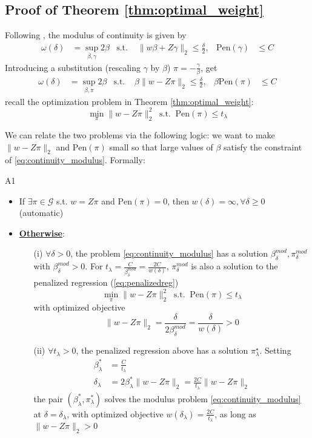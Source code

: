\documentclass[twoside]{article}
\theoremstyle{definition}
\begin{document}
\subsection{Proof of Theorem \ref{thm:optimal_weight}}
Following \citet[Equation (25)]{armstrong2018optimal}, the modulus of continuity is given by 
\begin{align*}
  \omega(\delta) &=\sup_{\beta,\gamma}2\beta &\text{s.t.\ }&\lVert w\beta+Z\gamma \rVert_2 \leq \frac{\delta}{2}, &\mathrm{Pen}(\gamma) &\leq C
\end{align*}
Introducing a substitution (rescaling $\gamma$ by $\beta$) $\pi = -\frac{\gamma}{\beta}$, get 
\begin{align}\label{eq:continuity_modulus}
  \omega(\delta) &=\sup_{\beta,\pi}2\beta &\text{s.t.\ }&\beta\lVert w-Z\pi \rVert_2 \leq \frac{\delta}{2}, &\beta\mathrm{Pen}(\pi) &\leq C
\end{align}
recall the optimization problem in Theorem \ref{thm:optimal_weight}:
$$ \min_{\pi}\lVert w-Z\pi \rVert^2_2 \ \text{ s.t. }\ \mathrm{Pen}(\pi)\leq t_{\lambda} $$

We can relate the two problems via the following logic: we want to make $\lVert w-Z\pi \rVert_2$ and $\mathrm{Pen}(\pi)$ small so that large values of $\beta$ satisfy the constraint of \ref{eq:continuity_modulus}. Formally:
\begin{lemma}{}{A1}
  \begin{itemize}
    \item If $\exists \pi \in\mathcal{G}$ s.t. $w=Z\pi$ and $\mathrm{Pen}(\pi)=0$, then $w(\delta)=\infty,\forall \delta\geq 0$ \hfill (automatic)
    \item \textbf{\underline{Otherwise}}:
    \begin{itemize}
      \item[(i)] $\forall \delta>0$, the problem \ref{eq:continuity_modulus} has a solution $\beta^{mod}_{\delta},\pi^{mod}_{\delta}$ with $\beta^{mod}_{\delta}>0$. For $t_{\lambda}=\frac{C}{\beta^{mod}_{\delta}}=\frac{2C}{w(\delta)}$, $\pi^{mod}_{\delta}$ is also a solution to the penalized regression (\ref{eq:penalizedreg})
      $$ \min_{\pi}\lVert w-Z\pi \rVert^2_2 \ \text{ s.t. }\ \mathrm{Pen}(\pi)\leq t_{\lambda} $$
      with optimized objective 
      $$ \lVert w-Z\pi \rVert_2 = \frac{\delta}{2\beta_{\delta}^{mod}}=\frac{\delta}{w(\delta)} >0$$

      \item[(ii)] $\forall t_{\lambda}>0$, the penalized regression above has a solution $\pi^{\star}_{\lambda}$. Setting
      \begin{align*}
        \beta^*_{\lambda} &=\frac{C}{t_{\lambda}} \\
        \delta_{\lambda} &=2\beta^*_{\lambda}\lVert w-Z\pi \rVert_2 = \frac{2C}{t_{\lambda}}\lVert w-Z\pi \rVert_2
      \end{align*}
      the pair $\left(\beta^*_{\lambda},\pi^*_{\lambda}\right)$ solves the modulus problem \ref{eq:continuity_modulus} at $\delta=\delta_{\lambda}$, with optimized objective $w(\delta_{\lambda})=\frac{2C}{t_{\lambda}}$, as long as $\lVert w-Z\pi \rVert_2 >0$
    \end{itemize}
  \end{itemize}
\end{lemma}
\end{document}
